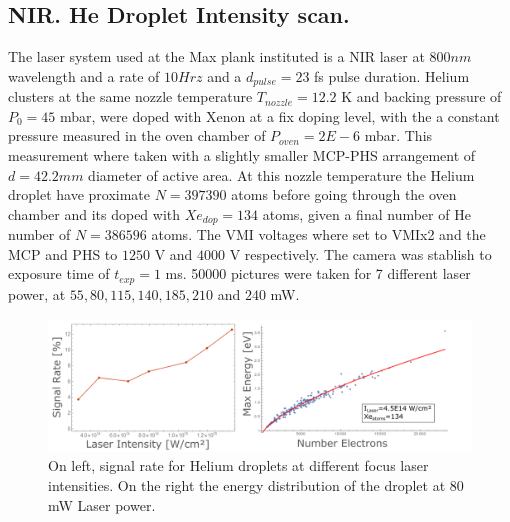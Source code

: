 \subsection{NIR. He Droplet Intensity scan.}

The laser system used at the Max plank instituted is a NIR laser at $800nm$ wavelength and a rate of $10Hrz$ and a $d_{pulse}=23$ fs pulse duration. Helium clusters at the same nozzle temperature $T_{nozzle}=12.2$ K and  backing pressure of $P_{0}=45$ mbar, were doped with Xenon at a fix doping level, with the a constant pressure measured in the oven chamber of $P_{oven}=2E-6$ mbar. This measurement where taken with a slightly smaller MCP-PHS arrangement of $d=42.2mm$ diameter of active area. At this nozzle temperature the Helium droplet have proximate $N=397390$ atoms before going through the oven chamber and its doped with $Xe_{dop}=134$ atoms, given a final number of He number of $N=386596$ atoms. The VMI voltages where set to VMIx2 and the MCP and PHS to $1250$ V and $4000$ V respectively. The camera was stablish to exposure time of $t_{exp}=1$ ms. 50000 pictures were taken for 7 different laser power, at $55,80,115,140,185,210$ and $240$ mW. 

\begin{figure}[h!]
\centering
\includegraphics[width=16 cm]{../Images/results/NIR_He_intensityscan/signalrate_EnerDisttri.png}
\caption[NIR Helium, signal rate and energy distribution]{On left, signal rate for Helium droplets at different focus laser intensities. On the right the energy distribution of the droplet at 80 mW Laser power.}
\label{fig:NIRHEdistribution}
\end{figure}


